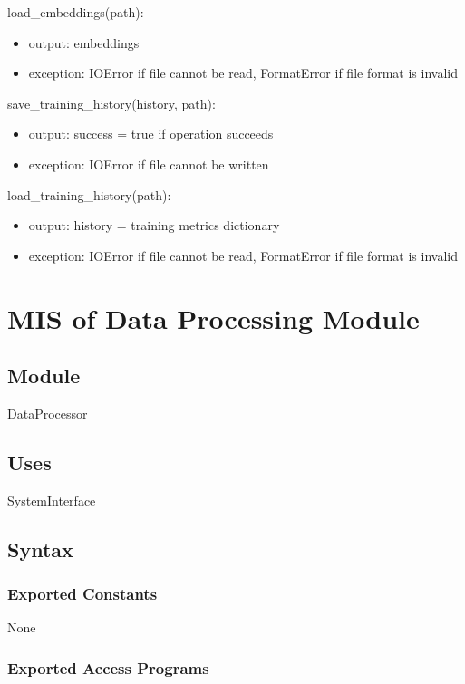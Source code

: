 \documentclass[12pt, titlepage]{article}
\begin{document}
\noindent load\_embeddings(path):
\begin{itemize}
\item output: embeddings
\item exception: IOError if file cannot be read, FormatError if file format is invalid
\end{itemize}

\noindent save\_training\_history(history, path):
\begin{itemize}
\item output: success = true if operation succeeds
\item exception: IOError if file cannot be written
\end{itemize}

\noindent load\_training\_history(path):
\begin{itemize}
\item output: history = training metrics dictionary
\item exception: IOError if file cannot be read, FormatError if file format is invalid
\end{itemize}

\section{MIS of Data Processing Module} \label{ModuleDP}

\subsection{Module}

DataProcessor

\subsection{Uses}
SystemInterface

\subsection{Syntax}

\subsubsection{Exported Constants}
None
\subsubsection{Exported Access Programs}
\end{document}
